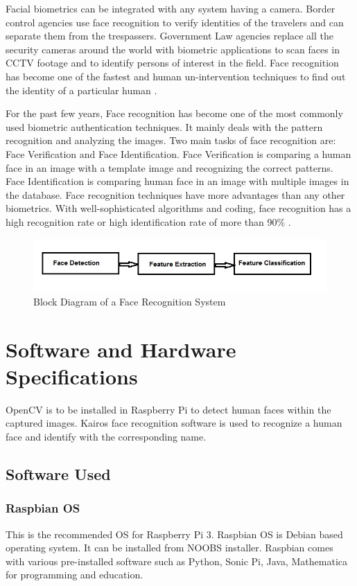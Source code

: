 \documentclass[sigconf]{acmart}
\begin{document}
Facial biometrics can be integrated with any system having a camera. Border control agencies use face recognition to verify identities of the travelers and can separate them from the trespassers. Government Law agencies replace all the security cameras around the world with biometric applications to scan faces in CCTV footage and to identify persons of interest in the field. Face recognition has become one of the fastest and human un-intervention techniques to find out the identity of a particular human \cite{biometrics2016}.

For the past few years, Face recognition has become one of the most commonly used biometric authentication techniques. It mainly deals with the pattern recognition and analyzing the images. Two main tasks of face recognition are: Face Verification and Face Identification. Face Verification is comparing a human face in an image with a template image and recognizing the correct patterns. Face Identification is comparing human face in an image with multiple images in the database. Face recognition techniques have more advantages than any other biometrics. With well-sophisticated algorithms and coding, face recognition has a high recognition rate or high identification rate of more than 90\% \cite{riddhi2013}. 

\begin{figure}[ht!]
  \includegraphics[width=\columnwidth]{images/Face-recognition.jpg}
  \caption{Block Diagram of a Face Recognition System}
\end{figure}


\section{Software and Hardware Specifications}
OpenCV is to be installed in Raspberry Pi to detect human faces within the captured images. Kairos face recognition software is used to recognize a human face and identify with the corresponding name.

\subsection{Software Used}

\subsubsection{Raspbian OS}
This is the recommended OS for Raspberry Pi 3. Raspbian OS is Debian based operating system. It can be installed from NOOBS installer. Raspbian comes with various pre-installed software such as Python, Sonic Pi, Java, Mathematica for programming and education.
\end{document}
